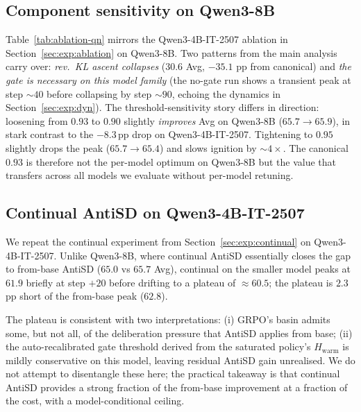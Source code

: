 \documentclass{article}
\begin{document}
\subsection{Component sensitivity on Qwen3-8B}
\label{app:ablation-qn}

Table~\ref{tab:ablation-qn} mirrors the Qwen3-4B-IT-2507 ablation in Section~\ref{sec:exp:ablation} on Qwen3-8B. Two patterns from the main analysis carry over: \emph{rev.\ KL ascent collapses} ($30.6$ Avg, $-35.1$ pp from canonical) and \emph{the gate is necessary on this model family} (the no-gate run shows a transient peak at step $\sim 40$ before collapsing by step $\sim 90$, echoing the dynamics in Section~\ref{sec:exp:dyn}). The threshold-sensitivity story differs in direction: loosening from $0.93$ to $0.90$ slightly \emph{improves} Avg on Qwen3-8B ($65.7 \to 65.9$), in stark contrast to the $-8.3$\,pp drop on Qwen3-4B-IT-2507. Tightening to $0.95$ slightly drops the peak ($65.7 \to 65.4$) and slows ignition by $\sim 4\times$. The canonical $0.93$ is therefore not the per-model optimum on Qwen3-8B but the value that transfers across all models we evaluate without per-model retuning.



\subsection{Continual AntiSD on Qwen3-4B-IT-2507}
\label{app:continual-q4}

We repeat the continual experiment from Section~\ref{sec:exp:continual} on Qwen3-4B-IT-2507. Unlike Qwen3-8B, where continual AntiSD essentially closes the gap to from-base AntiSD ($65.0$ vs $65.7$ Avg), continual on the smaller model peaks at $61.9$ briefly at step $+20$ before drifting to a plateau of $\approx 60.5$; the plateau is $2.3$\,pp short of the from-base peak ($62.8$).



The plateau is consistent with two interpretations: (i) GRPO's basin admits some, but not all, of the deliberation pressure that AntiSD applies from base; (ii) the auto-recalibrated gate threshold derived from the saturated policy's $H_{\mathrm{warm}}$ is mildly conservative on this model, leaving residual AntiSD gain unrealised. We do not attempt to disentangle these here; the practical takeaway is that continual AntiSD provides a strong fraction of the from-base improvement at a fraction of the cost, with a model-conditional ceiling.
\end{document}
